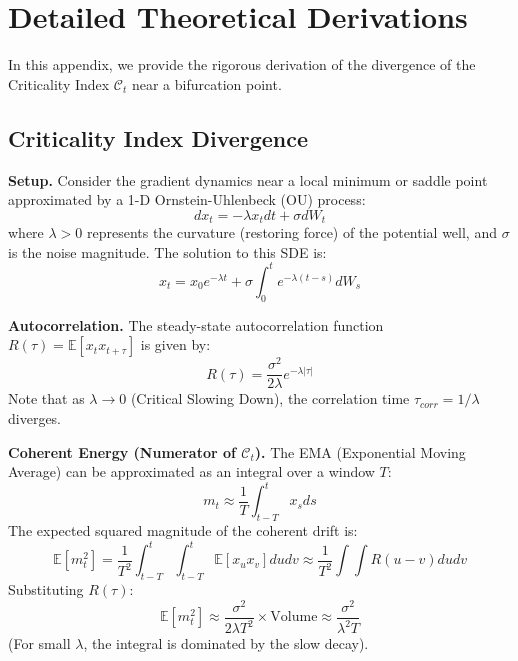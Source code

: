 \documentclass{article}
\theoremstyle{plain}
\theoremstyle{definition}
\theoremstyle{remark}
\newcommand{\C}{\mathcal{C}} %
\begin{document}
\section{Detailed Theoretical Derivations}
\label{app:theory}

In this appendix, we provide the rigorous derivation of the divergence of the Criticality Index $\C_t$ near a bifurcation point.

\subsection{Criticality Index Divergence}

\textbf{Setup.} Consider the gradient dynamics near a local minimum or saddle point approximated by a 1-D Ornstein-Uhlenbeck (OU) process:
\begin{equation}
    dx_t = -\lambda x_t dt + \sigma dW_t
\end{equation}
where $\lambda > 0$ represents the curvature (restoring force) of the potential well, and $\sigma$ is the noise magnitude.
The solution to this SDE is:
\begin{equation}
    x_t = x_0 e^{-\lambda t} + \sigma \int_0^t e^{-\lambda(t-s)} dW_s
\end{equation}

\textbf{Autocorrelation.} The steady-state autocorrelation function $R(\tau) = \mathbb{E}[x_t x_{t+\tau}]$ is given by:
\begin{equation}
    R(\tau) = \frac{\sigma^2}{2\lambda} e^{-\lambda |\tau|}
\end{equation}
Note that as $\lambda \to 0$ (Critical Slowing Down), the correlation time $\tau_{corr} = 1/\lambda$ diverges.

\textbf{Coherent Energy (Numerator of $\C_t$).}
The EMA (Exponential Moving Average) can be approximated as an integral over a window $T$:
\begin{equation}
    m_t \approx \frac{1}{T} \int_{t-T}^t x_s ds
\end{equation}
The expected squared magnitude of the coherent drift is:
\begin{equation}
    \mathbb{E}[m_t^2] = \frac{1}{T^2} \int_{t-T}^t \int_{t-T}^t \mathbb{E}[x_u x_v] du dv \approx \frac{1}{T^2} \int \int R(u-v) du dv
\end{equation}
Substituting $R(\tau)$:
\begin{equation}
    \mathbb{E}[m_t^2] \approx \frac{\sigma^2}{2\lambda T^2} \times \text{Volume} \approx \frac{\sigma^2}{\lambda^2 T}
\end{equation}
(For small $\lambda$, the integral is dominated by the slow decay).
\end{document}

